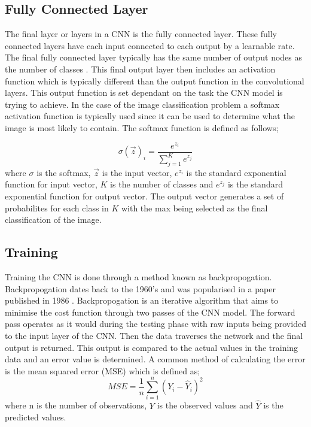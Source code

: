 \documentclass[10pt,twocolumn,letterpaper]{article}
\begin{document}
\subsection{Fully Connected Layer}
The final layer or layers in a CNN is the fully connected layer. These fully connected 
layers have each input connected to each output by a learnable rate. The final fully 
connected layer typically has the same number of output nodes as the number of classes
\cite{Yamashita2018}. This final output layer then includes an activation function 
which is typically different than the output function in the convolutional layers.
This output function is set dependant on the task the CNN model is trying to achieve.
In the case of the image classification problem a softmax activation function is 
typically used \cite{REN202351} since it can be used to determine what the image is most likely to contain.
The softmax function is defined as follows;

\begin{equation}
   \sigma(\vec{z})_i = \dfrac{e^{z_i}}{\sum_{j=1}^{K}e^{z_j}}
\end{equation}
where $\sigma$ is the softmax, $\vec{z}$ is the input vector, $e^{z_i}$ is the standard 
exponential function for input vector, $K$ is the number of classes and $e^{z_j}$ is the 
standard exponential function for output vector. The output vector generates a set of 
probabilites for each class in $K$ with the max being selected as the final classification 
of the image.
\subsection{Training}
Training the CNN is done through a method known as backpropogation. Backpropogation dates 
back to the 1960's and was popularised in a paper published in 1986 \cite{Rumelhart1986}.
Backpropogation is an iterative algorithm that aims to minimise the cost function through 
two passes of the CNN model. The forward pass operates as it would during the testing phase 
with raw inputs being provided to the input layer of the CNN. Then the data traverses the 
network and the final output is returned. This output is compared to the actual values 
in the training data and an error value is determined. A common method of calculating the 
error is the mean squared error (MSE) which is defined as;
\begin{equation}
   MSE = \dfrac{1}{n}\sum_{i=1}^{n}(Y_i - \hat{Y}_i)^2
\end{equation}
where n is the number of observations, $Y$ is the observed values and $\hat{Y}$ is the 
predicted values.
\end{document}
